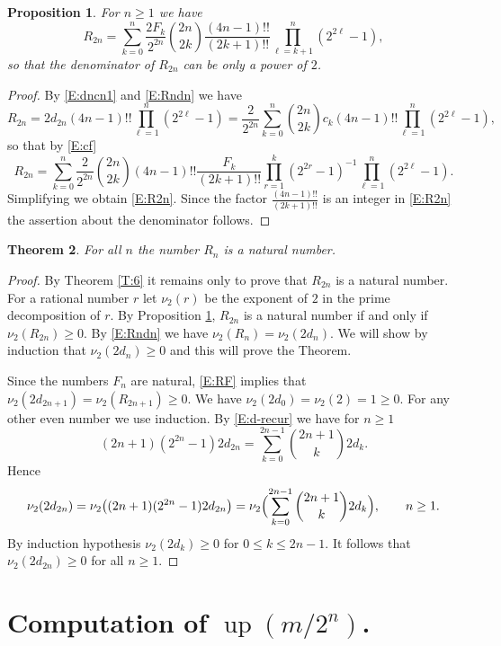 \documentclass[10pt]{amsart}
\newtheorem{thm}{Theorem}
\newtheorem{prop}[thm]{Proposition}
\theoremstyle{definition}
\theoremstyle{remark}
\DeclareMathOperator\up{up}
\begin{document}
\begin{prop}\label{P:7}
For $n\ge1$ we have
\begin{equation}\label{E:R2n}
R_{2n}=\sum_{k=0}^n \frac{2 F_k}{2^{2n}}\binom{2n}{2k}\frac{(4n-1)!!}{(2k+1)!!}
\prod_{\ell=k+1}^n(2^{2\ell}-1),
\end{equation}
so that the denominator of $R_{2n}$ can be only a power of $2$.
\end{prop}
\begin{proof}
By \eqref{E:dncn1} and \eqref{E:Rndn} we have
\[R_{2n}=
2d_{2n} (4n-1)!! \prod_{\ell=1}^n(2^{2\ell}-1)=
\frac{2}{2^{2n}}\sum_{k=0}^{n}\binom{2n}{2k}c_k (4n-1)!! \prod_{\ell=1}^n(2^{2\ell}-1),\]
so that by \eqref{E:cf}
\[R_{2n}=\sum_{k=0}^n \frac{2}{2^{2n}}\binom{2n}{2k}
(4n-1)!! \frac{F_k}{(2k+1)!!}\prod_{r=1}^k(2^{2r}-1)^{-1}\prod_{\ell=1}^n(2^{2\ell}-1).\]
Simplifying we obtain \eqref{E:R2n}. Since the factor $\frac{(4n-1)!!}{(2k+1)!!}$ is an integer
in \eqref{E:R2n} the  assertion about the denominator follows.
\end{proof}

\begin{thm}\label{T:8}
For all $n$ the number $R_n$ is a natural number.
\end{thm}

\begin{proof}
By Theorem \ref{T:6} it remains only to prove that $R_{2n}$ is a natural number.
For a rational number $r$ let $\nu_2(r)$ be the exponent of $2$ 
in the prime decomposition
of $r$. By Proposition \ref{P:7},  $R_{2n}$ is a 
natural number if and only if $\nu_2(R_{2n})\ge0$. By \eqref{E:Rndn} we have
$\nu_2(R_{n})=\nu_2(2d_{n})$.  We will show by induction that 
$\nu_2(2d_n)\ge0$ and this will prove the Theorem.

Since the numbers $F_n$ are natural, \eqref{E:RF} implies that 
$\nu_2(2d_{2n+1})=\nu_2(R_{2n+1})\ge0$. 
We have $\nu_2(2d_0)=\nu_2(2)=1\ge0$. For any other even number we use induction. By
\eqref{E:d-recur} we have for $n\ge1$
\begin{equation}\label{E:d2n=}
(2n+1)(2^{2n}-1)2d_{2n}=\sum_{k=0}^{2n-1}\binom{2n+1}{k}2d_k.
\end{equation}
Hence 
\[\nu_2(2d_{2n})=\nu_2\bigl((2n+1)(2^{2n}-1)2d_{2n}\bigr)=
\nu_2\Bigl(\sum_{k=0}^{2n-1}\binom{2n+1}{k}2d_k\Bigr),\qquad n\ge1.\]
By induction hypothesis $\nu_2(2d_k)\ge0$ for $0\le k\le 2n-1$. It follows that $\nu_2(2d_{2n})\ge0$
for all $n\ge1$. 
\end{proof}

\section{Computation of $\up(m/2^n)$.}\label{S:comput}
\end{document}
